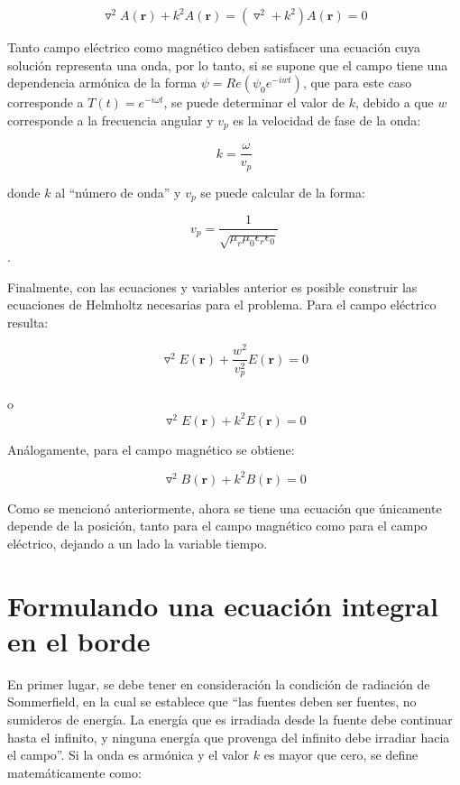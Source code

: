 \documentclass[12pt,letterpaper]{report}
\numberwithin{equation}{section}
\begin{document}
\begin{equation}
\triangledown^2A(\textbf{r})+k^2A(\textbf{r})=(\triangledown^2 + k^2)A(\textbf{r}) =0
\label{eq: ecuacion de helmholtz}
\end{equation}

Tanto campo eléctrico como magnético deben satisfacer una ecuación cuya solución representa una onda, por lo tanto, si se supone que el campo tiene una dependencia armónica de la forma $\psi = Re(\psi_{0}e^{-iwt})$, que para este caso corresponde a $T(t) = e^{-i\omega t}$, se puede determinar el valor de $k$, debido a que $w$ corresponde a la frecuencia angular y $v_{p}$ es la velocidad de fase de la onda:

$$k=\frac{\omega}{v_p}$$

\noindent donde $k$ al ``número de onda'' y $v_p$ se puede calcular de la forma:

$$v_p = \frac{1}{\sqrt{\mu_r\mu_0\epsilon_r\epsilon_0}}$$.

Finalmente, con las ecuaciones y variables anterior es posible construir las ecuaciones de Helmholtz necesarias para el problema. Para el campo eléctrico resulta:

\begin{equation*}
\triangledown^2E(\textbf{r})+\frac{w^2}{v_{p}^2}E(\textbf{r})=0
\end{equation*}
\\
o
\\
\begin{equation}
\triangledown^2E(\textbf{r})+k^2E(\textbf{r})=0
\label{eq:Helmholtz electrico}
\end{equation}

Análogamente, para el campo magnético se obtiene:

\begin{equation}
\triangledown^2B(\textbf{r})+k^2B(\textbf{r})=0
\label{eq:Helmholtz magnetico}
\end{equation}


Como se mencionó anteriormente, ahora se tiene una ecuación que únicamente depende de la posición, tanto para el campo magnético como para el campo eléctrico, dejando a un lado la variable tiempo.

\section{Formulando una ecuación integral en el borde}
En primer lugar, se debe tener en consideración la condición de radiación de Sommerfield, en la cual se establece que ``las fuentes deben ser fuentes, no sumideros de energía. La energía que es irradiada desde la fuente debe continuar hasta el infinito, y ninguna energía que provenga del infinito debe irradiar hacia el campo''. Si la onda es armónica y el valor $k$ es mayor que cero, se define matemáticamente como:
\end{document}
